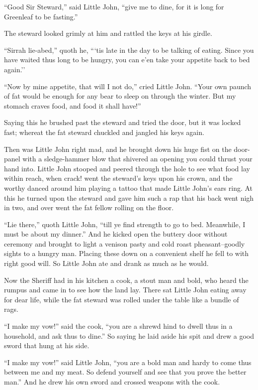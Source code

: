 ``Good Sir Steward,'' said Little John, ``give me to dine, for it is
long for Greenleaf to be fasting.''

The steward looked grimly at him and rattled the keys at his girdle.

``Sirrah lie-abed,'' quoth he, ```tis late in the day to be talking of
eating. Since you have waited thus long to be hungry, you can e'en take
your appetite back to bed again.''

``Now by mine appetite, that will I not do,'' cried Little John. ``Your
own paunch of fat would be enough for any bear to sleep on through the
winter. But my stomach craves food, and food it shall have!''

Saying this he brushed past the steward and tried the door, but it was
locked fast; whereat the fat steward chuckled and jangled his keys
again.

Then was Little John right mad, and he brought down his huge fist on the
door-panel with a sledge-hammer blow that shivered an opening you could
thrust your hand into. Little John stooped and peered through the hole
to see what food lay within reach, when crack! went the steward's keys
upon his crown, and the worthy danced around him playing a tattoo that
made Little John's ears ring. At this he turned upon the steward and
gave him such a rap that his back went nigh in two, and over went the
fat fellow rolling on the floor.

``Lie there,'' quoth Little John, ``till ye find strength to go to bed.
Meanwhile, I must be about my dinner.'' And he kicked open the buttery
door without ceremony and brought to light a venison pasty and cold
roast pheasant--goodly sights to a hungry man. Placing these down on a
convenient shelf he fell to with right good will. So Little John ate and
drank as much as he would.

Now the Sheriff had in his kitchen a cook, a stout man and bold, who
heard the rumpus and came in to see how the land lay. There sat Little
John eating away for dear life, while the fat steward was rolled under
the table like a bundle of rags.

``I make my vow!'' said the cook, ``you are a shrewd hind to dwell thus
in a household, and ask thus to dine.'' So saying he laid aside his spit
and drew a good sword that hung at his side.

``I make my vow!'' said Little John, ``you are a bold man and hardy to
come thus between me and my meat. So defend yourself and see that you
prove the better man.'' And he drew his own sword and crossed weapons
with the cook.

